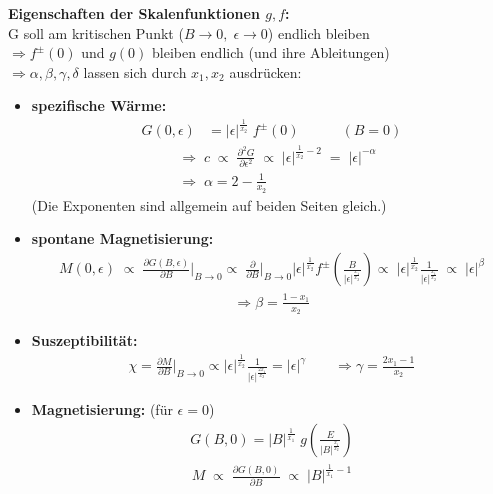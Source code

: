 \documentclass[12pt]{article}
\begin{document}
\textbf{Eigenschaften der Skalenfunktionen $g,f$:} \\
G soll am kritischen Punkt ($B\to 0, \; \epsilon \to 0$) endlich bleiben\\
$\Rightarrow f^\pm (0)$ und $g(0)$ bleiben endlich (und ihre Ableitungen) \\
$\Rightarrow \alpha, \beta, \gamma, \delta$ lassen sich durch $x_1, x_2$ ausdrücken: \\
\begin{itemize}
\item \textbf{spezifische Wärme:} \begin{align}
G(0, \epsilon) &= \vert \epsilon \vert
^\frac{1}{x_2}\;  f^\pm (0) \quad \quad \quad  (B=0) 
\end{align}
\begin{align}
&\Rightarrow \;  c \; \propto \;  \frac{\partial^2 G}{\partial \epsilon^2} \; \propto \; \vert \epsilon \vert ^{\frac{1}{x_2}-2} \; = \; \vert \epsilon \vert ^{-\alpha}  \\
& \Rightarrow \;  \alpha = 2- \frac{1}{x_2} 
\end{align}
(Die Exponenten sind allgemein auf beiden Seiten gleich.)

\item \textbf{spontane Magnetisierung:} 
\begin{align}
M(0,\epsilon) \;  \propto \;  \frac{\partial G(B, \epsilon)}{\partial B} \Biggr\vert_{B \to 0} \propto \; \frac{\partial }{\partial B} \Biggr\vert_{B \to 0}  
 \vert \epsilon \vert ^\frac{1}{x_2} f^\pm \left(\frac{B}{\vert \epsilon \vert ^\frac{x_1}{x_2}} \right) \propto \; \vert \epsilon \vert ^\frac{1}{x_2} \frac{1}{\vert \epsilon \vert ^\frac{x_1}{x_2}} \; \propto \;  \vert \epsilon \vert ^\beta 
 \end{align}
 \begin{align}
 \Rightarrow \beta = \frac{1-x_1}{x_2}
\end{align}
\item \textbf{Suszeptibilität:}
\begin{align}
\chi = \frac{\partial M}{\partial B} \Bigg\vert_{B \to 0}
 \propto \vert \epsilon \vert ^\frac{1}{x_2} \frac{1}{\vert \epsilon \vert ^\frac{2 x_1}{x_2}} = \vert \epsilon \vert ^\gamma \quad \quad \Rightarrow \gamma = \frac{2x_1 -1}{x_2}
\end{align}
\item \textbf{Magnetisierung:} (für $\epsilon =0$)
\begin{align*}
G(B, 0 ) = \vert B \vert ^\frac{1}{x_1} \; g\left( \frac{E}{\vert B \vert^\frac{x_1}{x_2}} \right)
\end{align*}
\begin{align}
M \; \propto \;  \frac{\partial G(B,0)}{\partial B} \; \propto \; \vert B \vert ^{\frac{1}{x_1} - 1}
\end{align}
\end{itemize}
\end{document}
